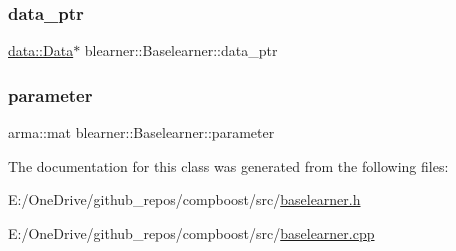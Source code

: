 \mbox{\label{classblearner_1_1_baselearner_a5b5cfab411ff94a13bcce4ca0dd4e507}} 
\subsubsection{\texorpdfstring{data\+\_\+ptr}{data\_ptr}}
{\footnotesize\ttfamily \mbox{\hyperlink{classdata_1_1_data}{data\+::\+Data}}$\ast$ blearner\+::\+Baselearner\+::data\+\_\+ptr\hspace{0.3cm}{\ttfamily [protected]}}

\mbox{\label{classblearner_1_1_baselearner_a56e401f574b274d65e364493277f3247}} 
\subsubsection{\texorpdfstring{parameter}{parameter}}
{\footnotesize\ttfamily arma\+::mat blearner\+::\+Baselearner\+::parameter\hspace{0.3cm}{\ttfamily [protected]}}



The documentation for this class was generated from the following files\+:\begin{DoxyCompactItemize}
\item 
E\+:/\+One\+Drive/github\+\_\+repos/compboost/src/\mbox{\hyperlink{baselearner_8h}{baselearner.\+h}}\item 
E\+:/\+One\+Drive/github\+\_\+repos/compboost/src/\mbox{\hyperlink{baselearner_8cpp}{baselearner.\+cpp}}\end{DoxyCompactItemize}
